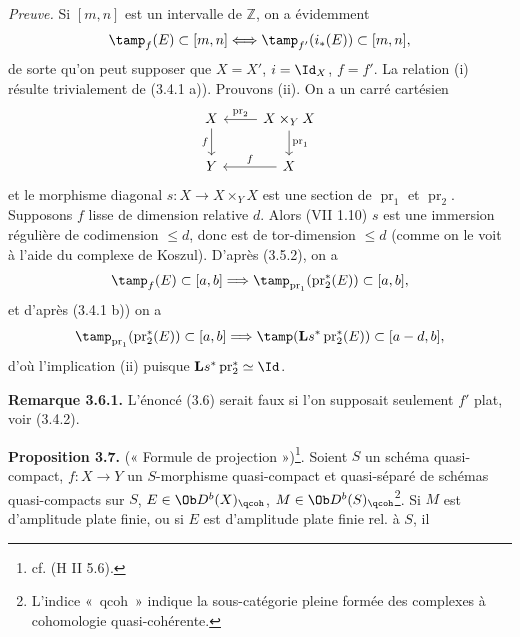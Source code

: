 \emph{Preuve.} Si \([m,n]\) est un intervalle de \(\mathbb Z\), on a évidemment
\[
 \tamp_f(E)\subset[m,n]
 \Longleftrightarrow
 \tamp_{f'}(i_*(E))\subset[m,n],
\]
de sorte qu'on peut supposer que \(X=X'\), \(i=\Id_X\), \(f=f'\). La relation (i) résulte trivialement de (3.4.1 a)). Prouvons (ii). On a un carré cartésien
\[
\begin{tikzcd}
X \arrow[d,"f"'] & X\times_Y X \arrow[l,"\operatorname{pr}_2"'] \arrow[d,"\operatorname{pr}_1"]\\
Y & X \arrow[l,"f"']
\end{tikzcd}
\]
et le morphisme diagonal \(s:X\longrightarrow X\times_YX\) est une section de \(\operatorname{pr}_1\) et \(\operatorname{pr}_2\). Supposons \(f\) lisse de dimension relative \(d\). Alors (VII 1.10) \(s\) est une immersion régulière de codimension \(\leq d\), donc est de tor-dimension \(\leq d\) (comme on le voit à l'aide du complexe de Koszul). D'après (3.5.2), on a
\[
 \tamp_f(E)\subset[a,b]
 \Longrightarrow
 \tamp_{\operatorname{pr}_1}(\operatorname{pr}_2^*(E))\subset[a,b],
\]
et d'après (3.4.1 b)) on a
\[
 \tamp_{\operatorname{pr}_1}(\operatorname{pr}_2^*(E))\subset[a,b]
 \Longrightarrow
 \tamp(\mathbf Ls^*\operatorname{pr}_2^*(E))\subset[a-d,b],
\]
d'où l'implication (ii) puisque \(\mathbf Ls^*\operatorname{pr}_2^*\simeq\Id\).

\textbf{Remarque 3.6.1.} L'énoncé (3.6) serait faux si l'on supposait seulement \(f'\) plat, voir (3.4.2).

\textbf{Proposition 3.7.} (« Formule de projection »)\footnote{cf. (H II 5.6).}. Soient \(S\) un schéma quasi-compact, \(f:X\to Y\) un \(S\)-morphisme quasi-compact et quasi-séparé de schémas quasi-compacts sur \(S\), \(E\in\Ob D^b(X)_{\qcoh}\), \(M\in\Ob D^b(S)_{\qcoh}\)\footnote{L'indice «~qcoh~» indique la sous-catégorie pleine formée des complexes à cohomologie quasi-cohérente.}. Si \(M\) est d'amplitude plate finie, ou si \(E\) est d'amplitude plate finie rel. à \(S\), il
